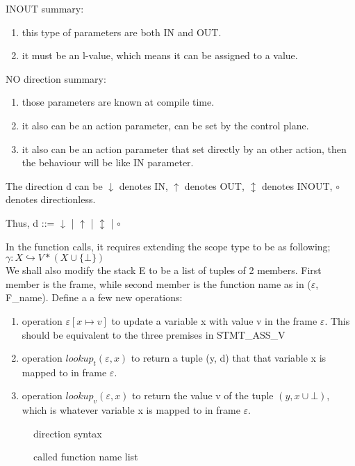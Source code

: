 \documentclass[UTF8]{article}
\begin{document}
INOUT summary:
\begin{enumerate}
\item this type of parameters are both IN and OUT.
\item it must be an l-value, which means it can be assigned to a value.
\end{enumerate}
NO direction summary:
\begin{enumerate}
\item those parameters are known at compile time.
\item it also can be an action parameter, can be set by the control plane.
\item it also can be an action parameter that set directly by an other action, then the behaviour will be like IN parameter.
\end{enumerate}

The direction d can be $\downarrow$ denotes IN, $\uparrow$ denotes OUT, $\updownarrow$ denotes INOUT, $\circ$ denotes directionless. 

Thus,
d ::= $\downarrow$ | $\uparrow$ | $\updownarrow$ | $\circ$

In the function calls, it requires extending the scope type to be as following;
$ \gamma : X \hookrightarrow V * (X \cup \{ \bot \})  $ \\We shall also modify the stack E to be a list of tuples of 2 members. First member is the frame, while second member is the function name as in ($\varepsilon$, F\_name). Define a a few new operations: 
\begin{enumerate}
\item operation $\varepsilon[x \longmapsto v]$ to update a variable x with value v in the frame $\varepsilon$. This should be equivalent to the three premises in STMT\_ASS\_V
\item operation $lookup_t(\varepsilon, x)$ to return a tuple (y, d) that that variable x is mapped to in frame $\varepsilon$. 
\item operation $lookup_v(\varepsilon, x)$ to return the value v of the tuple $(y, x \cup {\bot})$, which is whatever variable x is mapped to in frame $\varepsilon$. 
\end{enumerate}

\begin{figure}[h]
\centering\ottgrammartabular{
\ottd\ottafterlastrule
}
\caption{direction syntax}
\label{fig:dir}
\end{figure}

\begin{figure}[h]
\centering\ottgrammartabular{
\ottcalledXXfunctionXXname\ottafterlastrule
}
\caption{called function name list}
\label{fig:fnl}
\end{figure}
\end{document}
